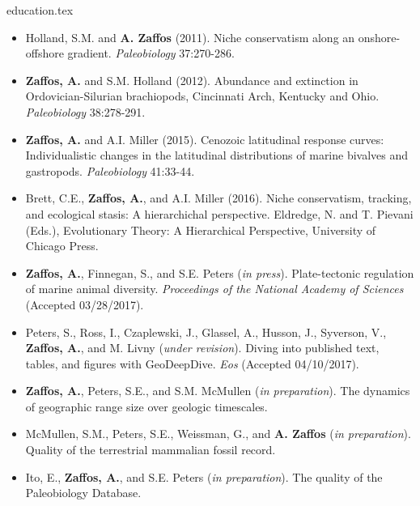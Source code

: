 \documentclass[12pt, a4paper]{awesome-cv}
\newcommand*{\sectiondir}{resume/}
\begin{document}
\makecvheader

{education.tex}
\vspace{-20pt}

\fontsize{10pt}{1em}\bodyfontlight\upshape\color{text}
\begin{itemize}[leftmargin=*]
\item{Holland, S.M. and \textbf{A. Zaffos} (2011). Niche conservatism along an onshore-offshore gradient. \textit{Paleobiology} 37:270-286.}
\item{\textbf{Zaffos, A.} and S.M. Holland (2012). Abundance and extinction in Ordovician-Silurian brachiopods, Cincinnati Arch, Kentucky and Ohio. \textit{Paleobiology} 38:278-291.}
\item{\textbf{Zaffos, A.} and A.I. Miller (2015). Cenozoic latitudinal response curves: Individualistic changes in the latitudinal distributions of marine bivalves and gastropods. \textit{Paleobiology} 41:33-44.}
\item{Brett, C.E., \textbf{Zaffos, A.}, and A.I. Miller (2016). Niche conservatism, tracking, and ecological stasis: A hierarchichal perspective. Eldredge, N. and T. Pievani (Eds.), Evolutionary Theory: A Hierarchical Perspective, University of Chicago Press.}
\item{\textbf{Zaffos, A.}, Finnegan, S., and S.E. Peters (\textit{in press}). Plate-tectonic regulation of marine animal diversity. \textit{Proceedings of the National Academy of Sciences} (Accepted 03/28/2017).}
\item{Peters, S., Ross, I., Czaplewski, J., Glassel, A., Husson, J., Syverson, V., \textbf{Zaffos, A.}, and M. Livny (\textit{under revision}). Diving into published text, tables, and figures with GeoDeepDive. \textit{Eos} (Accepted 04/10/2017).}
\item{\textbf{Zaffos, A.}, Peters, S.E., and S.M. McMullen (\textit{in preparation}). The dynamics of geographic range size over geologic timescales.}
\item{McMullen, S.M., Peters, S.E., Weissman, G., and \textbf{A. Zaffos} (\textit{in preparation}). Quality of the terrestrial mammalian fossil record.}
\item{Ito, E., \textbf{Zaffos, A.}, and S.E. Peters (\textit{in preparation}). The quality of the Paleobiology Database.}
\end{itemize}
\end{document}
